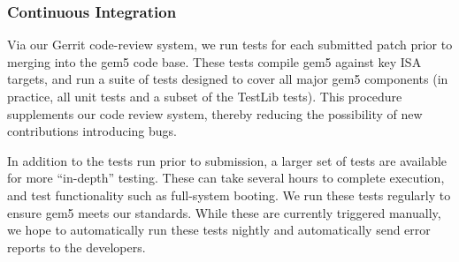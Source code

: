 \subsubsection{Continuous Integration}

Via our Gerrit code-review system, we run tests for each
submitted patch prior to merging into the gem5 code base. These tests
compile gem5 against key ISA targets, and run a suite of tests designed to
cover all major gem5 components (in practice, all unit tests and a subset of
the TestLib tests). This procedure supplements our code review system, thereby
reducing the possibility of new contributions introducing bugs.

In addition to the tests run prior to submission, a larger set of tests are
available for more ``in-depth'' testing. These can take several hours to complete
execution, and  test functionality such as
full-system booting. We run these tests regularly to ensure gem5 meets our
standards. While these are currently triggered manually, we hope to
automatically run these tests nightly and automatically send error reports to
the developers.
